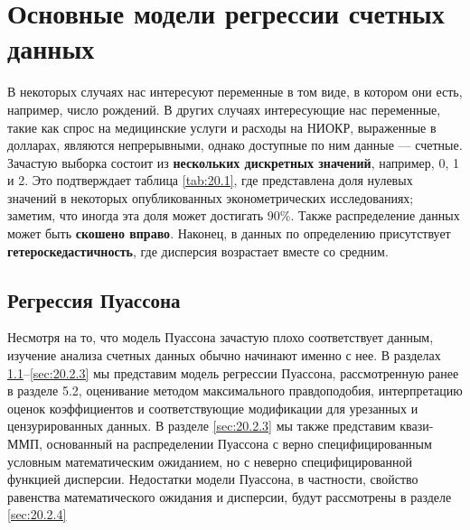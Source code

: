 \section{Основные модели регрессии счетных данных}\label{sec:20.2}

\noindent
В некоторых случаях нас интересуют переменные в том виде, в котором они есть, например, число рождений. В других случаях интересующие нас переменные, такие как спрос на медицинские услуги и расходы на НИОКР, выраженные в долларах, являются непрерывными, однако доступные по ним данные --- счетные. Зачастую выборка состоит из \textbf{нескольких дискретных значений}, например, 0, 1 и 2. Это подтверждает таблица \ref{tab:20.1}, где представлена доля нулевых значений в некоторых опубликованных эконометрических исследованиях; заметим, что иногда эта доля может достигать 90\%. Также распределение данных может быть \textbf{скошено вправо}. Наконец, в данных по определению присутствует \textbf{гетероскедастичность}, где дисперсия возрастает вместе со средним.


\subsection{Регрессия Пуассона}\label{sec:20.2.1}

\noindent
Несмотря на то, что модель Пуассона зачастую плохо соответствует данным, изучение анализа счетных данных обычно начинают именно с нее. В разделах \ref{sec:20.2.1}--\ref{sec:20.2.3} мы представим модель регрессии Пуассона, рассмотренную ранее в разделе 5.2, %
оценивание методом максимального правдоподобия, интерпретацию оценок коэффициентов и соответствующие модификации для урезанных и цензурированных данных. В разделе \ref{sec:20.2.3} мы также представим квази-ММП, основанный на распределении Пуассона с верно специфицированным условным математическим ожиданием, но с неверно специфицированной функцией дисперсии. Недостатки модели Пуассона, в частности, свойство равенства математического ожидания и дисперсии, будут рассмотрены в разделе \ref{sec:20.2.4}

